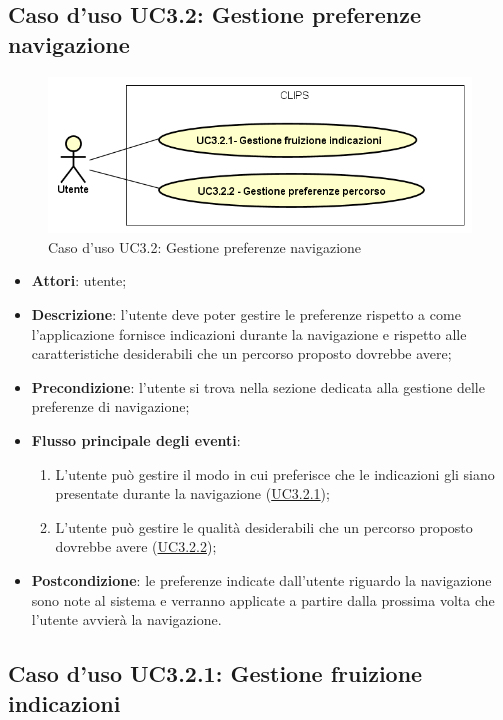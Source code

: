 \documentclass[../AnalisiDeiRequisiti.tex]{subfiles}
\begin{document}
\subsection{Caso d'uso UC3.2: Gestione preferenze navigazione}

\begin{figure}[H]
	\centering
	\includegraphics[scale=0.95, width=\textwidth]{img/UC3-2.png}
	\caption{Caso d'uso UC3.2: Gestione preferenze navigazione}\label{fig:UC3.2} 
\end{figure}
\begin{itemize}
	\item \textbf{Attori}: utente;
	\item \textbf{Descrizione}: l'utente deve poter gestire le preferenze rispetto a come l'applicazione fornisce indicazioni durante la navigazione e rispetto alle caratteristiche desiderabili che un percorso proposto dovrebbe avere; 
	\item \textbf{Precondizione}: l'utente si trova nella sezione dedicata alla gestione delle preferenze di navigazione;
	
	\item \textbf{Flusso principale degli eventi}:
	\begin{enumerate}
		\item L'utente può gestire il modo in cui preferisce che le indicazioni gli siano presentate durante la navigazione (\hyperlink{UC3.2.1}{UC3.2.1});
		\item L'utente può gestire le qualità desiderabili che un percorso proposto dovrebbe avere (\hyperlink{UC3.2.2}{UC3.2.2});
		
	\end{enumerate}
	\item \textbf{Postcondizione}: le preferenze indicate dall'utente riguardo la navigazione sono note al sistema e verranno applicate a partire dalla prossima volta che l'utente avvierà la navigazione.
\end{itemize}
\hypertarget{UC3.2.1}{}
\subsection{Caso d'uso UC3.2.1: Gestione fruizione indicazioni}
\end{document}
